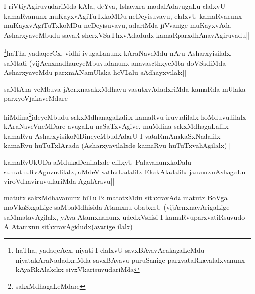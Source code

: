 
\begin{artha}
I riVtiyAgiruvudariMda kAla, deYva, Ishavxra modalAdavugaLu elalxvU kamaRvanunx muKayxvAgiTuTxkoMDu neDeyisuvavu, elalxvU kamaRvanunx muKayxvAgiTuTxkoMDu neDeyisuvavu, adariMda jiVvanige muKayxvAda AsharxyaveMbudu savaR sherxVSaThxvAdadudx kamaRparxdhAnavAgiruvadu||
\end{artha}

\begin{artha}
\footnote{haTha, yadaqcAcx, niyati I elalxvU savxBAvavAcakagaLeMdu niyatakAraNadadxriMda savxBAvavu puruSanige parxvataRkavalalxvanunx kAyaRkAlakekx sivxVkarisuvudariMda}haTha yadaqceCx, vidhi ivugaLanunx kAraNaveMdu nAvu Asharxyisilalx, saMtati (vijAcnxnadhareyeMbuvudanunx anavasethxyeMba doVSadiMda AsharxyaveMdu parxmANamUlaka heVLalu sAdhayxvilalx||
\end{artha}


\begin{artha}
saMtAna veMbuva jAcnxnasakxMdhavu vasutxvAdadxriMda kamaRda mUlaka parxyoVjakaveMdare
\end{artha}

\begin{artha}
hiMdina\footnote{sakxMdhagaLeMdare}ideyeMbudu sakxMdhanagaLalilx kamaRvu iruvudilalx hoMduvudilalx kAraNaveVneMDare avugaLu naSaTxvAgive. muMdina sakxMdhagaLalilx kamaRvu AsharxyisikoMDineyeMbudAdarU I vataRmAnakaSxNadalilx kamaRvu huTuTxlAradu (Asharxyavilalxde kamaRvu huTuTxvahAgilalx)||
\end{artha}


\begin{artha}
kamaRvUkUDa aMdukaDenilalxde elilxyU PalavanunxkoDalu samathaRvAguvudilalx, oMdeV sathxLadalilx EkakAladalilx janamxnAshagaLu viroVdhaviruvudariMda AgalAravu||
\end{artha}

\begin{artha}
matutx sakxMdhavanunx biTuTx matotxMdu sithxravAda matutx BoVga moVkaSxgaLige saMbaMdhisida Atamxnu obabxnU (vijAcnxnavArigaLige saMmatavAgilalx, yAva Atamxnanunx udedxVshisi I kamaRvuparxvatiRsuvudo A Atamxnu sithxravAgidudx(avarige ilalx)
\end{artha}

